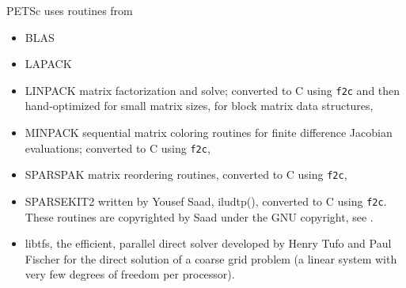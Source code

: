 \vspace{.3in}
\noindent
PETSc uses routines from 
\begin{itemize}
  \item BLAS
  \item LAPACK
  \item LINPACK      matrix factorization and solve; converted to C using {\tt f2c} and then 
                      hand-optimized for small matrix sizes, for block matrix data structures,
  \item MINPACK      sequential matrix coloring routines for finite difference Jacobian
                       evaluations; converted to C using {\tt f2c},
  \item SPARSPAK     matrix reordering routines, converted to C using {\tt f2c},
  \item SPARSEKIT2   written by Yousef Saad, iludtp(), converted to C using {\tt f2c}. These routines 
                     are copyrighted by Saad under the GNU copyright, see .
  \item libtfs, the efficient, parallel direct solver developed by Henry Tufo and Paul Fischer for the direct solution of a coarse grid problem (a linear system with very few degrees of freedom per processor).
\end{itemize}


